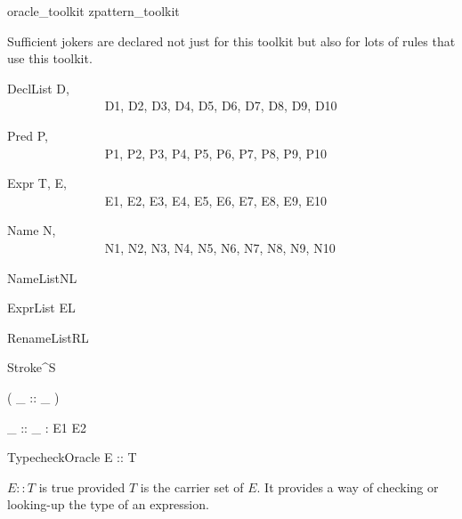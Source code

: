 
%

\begin{zsection}
  \SECTION oracle\_toolkit \parents zpattern\_toolkit
\end{zsection}

Sufficient jokers are declared not just for this toolkit
but also for lots of rules that use this toolkit.

\begin{zedjoker}{DeclList} D, {}\\~~~~~~~~~~~~~~~ D1, D2, D3, D4, D5, D6, D7, D8, D9, D10 \end{zedjoker}
\begin{zedjoker}{Pred} P, {}\\~~~~~~~~~~~~~~~ P1, P2, P3, P4, P5, P6, P7, P8, P9, P10 \end{zedjoker}
\begin{zedjoker}{Expr} T, E, {}\\~~~~~~~~~~~~~~~ E1, E2, E3, E4, E5, E6, E7, E8, E9, E10 \end{zedjoker}
\begin{zedjoker}{Name} N, {}\\~~~~~~~~~~~~~~~ N1, N2, N3, N4, N5, N6, N7, N8, N9, N10 \end{zedjoker}
\begin{zedjoker}{NameList}NL\end{zedjoker}
\begin{zedjoker}{ExprList} EL \end{zedjoker}
\begin{zedjoker}{RenameList}RL\end{zedjoker}
\begin{zedjoker}{Stroke}{}^S\end{zedjoker}


\begin{zed}
  \relation ( \_ :: \_ )
\end{zed}

\begin{gendef}[E1,E2]
  \_ :: \_ : E1 \rel E2
\end{gendef}

\begin{zedoracle}{TypecheckOracle}
  E :: T
\end{zedoracle}
$E :: T$ is true provided $T$ is the carrier set of $E$.
It provides a way of checking or looking-up the type of an expression.

